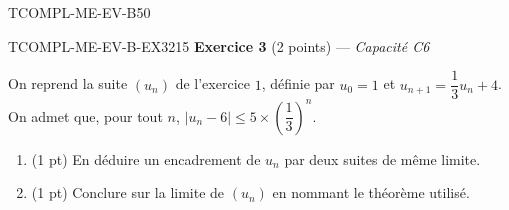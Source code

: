\begin{evaluation}{TCOMPL-ME-EV-B}{50}
\begin{exercice}{TCOMPL-ME-EV-B-EX3}{2}{15}
\textbf{Exercice 3} (2 points) --- \textit{Capacité C6}

\medskip

On reprend la suite $(u_n)$ de l'exercice $1$, définie par $u_0=1$ et $u_{n+1}=\dfrac13u_n+4$. On admet que, pour tout $n$, $\left|u_n-6\right|\leq 5\times\left(\dfrac13\right)^{n}$.
\begin{enumerate}
  \item (1 pt) En déduire un encadrement de $u_n$ par deux suites de même limite.
  \item (1 pt) Conclure sur la limite de $(u_n)$ en nommant le théorème utilisé.
\end{enumerate}
\end{exercice}

\end{evaluation}
